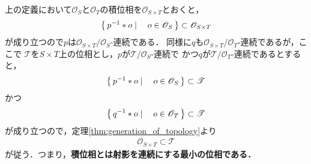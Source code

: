	上の定義において$\mathscr{O}_{S}$と$\mathscr{O}_{T}$の積位相を$\mathscr{O}_{S \times T}$とおくと，
	\begin{align}
		\left\{\, p^{-1} \ast o \mid \quad o \in \mathscr{O}_{S}\, \right\} \subset \mathscr{O}_{S \times T}
	\end{align}
	が成り立つので$p$は$\mathscr{O}_{S \times T}/\mathscr{O}_{S}$-連続である．
	同様に$q$も$\mathscr{O}_{S \times T}/\mathscr{O}_{T}$-連続であるが，ここで
	$\mathscr{T}$を$S \times T$上の位相とし，$p$が$\mathscr{T}/\mathscr{O}_{S}$-連続で
	かつ$q$が$\mathscr{T}/\mathscr{O}_{T}$-連続であるとすると，
	\begin{align}
		\left\{\, p^{-1} \ast o \mid \quad o \in \mathscr{O}_{S}\, \right\} \subset \mathscr{T}
	\end{align}
	かつ
	\begin{align}
		\left\{\, q^{-1} \ast o \mid \quad o \in \mathscr{O}_{T}\, \right\} \subset \mathscr{T}
	\end{align}
	が成り立つので，定理\ref{thm:generation_of_topology}より
	\begin{align}
		\mathscr{O}_{S \times T} \subset \mathscr{T}
	\end{align}
	が従う．つまり，{\bf 積位相とは射影を連続にする最小の位相である．}
	
	\begin{screen}
		\begin{dfn}[直積の位相]
			
		\end{dfn}
	\end{screen}